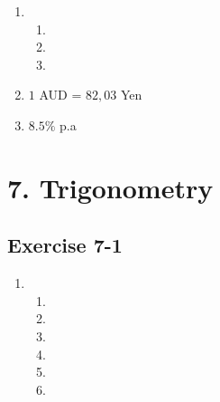 \begin{enumerate}[label=\textbf{\arabic*}., itemsep=5pt]
\begin{enumerate}[label=\textbf{\arabic*}.]
	\item %
	\begin{enumerate}[noitemsep, label=\textbf{(\alph*)} ]
	    \item %
	    \item %
	    \item %
	\end{enumerate}

	\item $1$ AUD = $82,03$ Yen%

	\item $8.5\%$ p.a%
    \end{enumerate}


\section {7. Trigonometry}
\subsection{Exercise 7-1} %
\begin{enumerate}[itemsep=5pt, label=\textbf{\arabic*}. ]
\item %
\begin{enumerate}[noitemsep, label=\textbf{(\alph*)} ]
 \item 
\item 
\item 
\item 
\item 
\item 
\end{enumerate}




\end{enumerate}
\end{enumerate}
